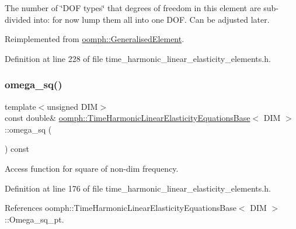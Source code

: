 The number of \char`\"{}\+D\+O\+F types\char`\"{} that degrees of freedom in this element are sub-\/divided into\+: for now lump them all into one D\+OF. Can be adjusted later. 



Reimplemented from \hyperlink{classoomph_1_1GeneralisedElement_a0c6037a870597b35dcf1c780710b9a56}{oomph\+::\+Generalised\+Element}.



Definition at line 228 of file time\+\_\+harmonic\+\_\+linear\+\_\+elasticity\+\_\+elements.\+h.

\mbox{\label{classoomph_1_1TimeHarmonicLinearElasticityEquationsBase_ab28add7b27b84c2d1726af7335cf2c84}} 
\subsubsection{\texorpdfstring{omega\+\_\+sq()}{omega\_sq()}}
{\footnotesize\ttfamily template$<$unsigned D\+IM$>$ \\
const double\& \hyperlink{classoomph_1_1TimeHarmonicLinearElasticityEquationsBase}{oomph\+::\+Time\+Harmonic\+Linear\+Elasticity\+Equations\+Base}$<$ D\+IM $>$\+::omega\+\_\+sq (\begin{DoxyParamCaption}{ }\end{DoxyParamCaption}) const\hspace{0.3cm}{\ttfamily [inline]}}



Access function for square of non-\/dim frequency. 



Definition at line 176 of file time\+\_\+harmonic\+\_\+linear\+\_\+elasticity\+\_\+elements.\+h.



References oomph\+::\+Time\+Harmonic\+Linear\+Elasticity\+Equations\+Base$<$ D\+I\+M $>$\+::\+Omega\+\_\+sq\+\_\+pt.

\mbox{\label{classoomph_1_1TimeHarmonicLinearElasticityEquationsBase_a16e82dada5446d62cd97b802f456b423}} 
